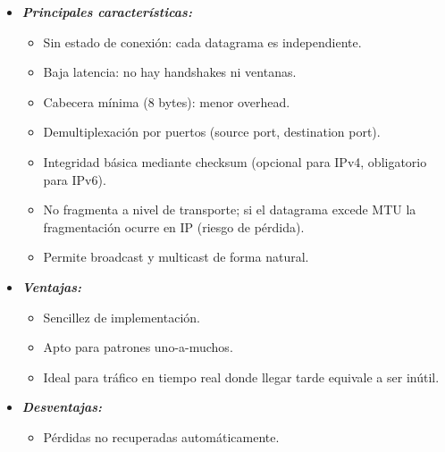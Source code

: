 \documentclass[12pt]{amsart}
\begin{document}
\begin{enumerate}
\begin{itemize}
		\item \textbf{\textit{Principales características:}}

			\begin{itemize}
			
			\item Sin estado de conexión: cada datagrama es independiente.

			\item Baja latencia: no hay handshakes ni ventanas.

			\item Cabecera mínima (8 bytes): menor overhead.

			\item Demultiplexación por puertos (source port, destination port).

			\item Integridad básica mediante checksum (opcional para IPv4, obligatorio para IPv6).

			\item No fragmenta a nivel de transporte; si el datagrama excede MTU la fragmentación ocurre en IP (riesgo de pérdida).

			\item Permite broadcast y multicast de forma natural.

			\end{itemize}
		
		\medskip \medskip	

		\item \textbf{\textit{Ventajas:}}

			\begin{itemize}
			
			\item Sencillez de implementación.

			\item Apto para patrones uno-a-muchos.

			\item Ideal para tráfico en tiempo real donde llegar tarde equivale a ser inútil.

			\end{itemize}

		\medskip \medskip

		\item \textbf{\textit{Desventajas:}}

			\begin{itemize}
			
			\item Pérdidas no recuperadas automáticamente.


\end{itemize}
\end{itemize}
\end{enumerate}
\end{document}
